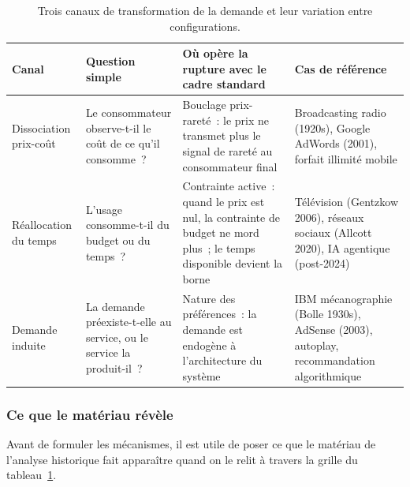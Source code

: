 \begin{table}[!ht]
\caption{Trois canaux de transformation de la demande et leur variation entre configurations.}\label{tab:d5-canaux}
\centering\footnotesize
\renewcommand{\arraystretch}{1.35}
\begin{tabularx}{\textwidth}{@{}p{2.2cm}Xp{3.2cm}p{3.2cm}@{}}
\toprule
\textbf{Canal} & \textbf{Question simple} & \textbf{Où opère la rupture avec le cadre standard} & \textbf{Cas de référence} \\
\midrule
Dissociation prix-coût & Le consommateur observe-t-il le coût de ce qu'il consomme~? & Bouclage prix-rareté~: le prix ne transmet plus le signal de rareté au consommateur final & Broadcasting radio (1920s), Google AdWords (2001), forfait illimité mobile \\[4pt]
Réallocation du temps & L'usage consomme-t-il du budget ou du temps~? & Contrainte active~: quand le prix est nul, la contrainte de budget ne mord plus~; le temps disponible devient la borne & Télévision (Gentzkow 2006), réseaux sociaux (Allcott 2020), IA agentique (post-2024) \\[4pt]
Demande induite & La demande préexiste-t-elle au service, ou le service la produit-il~? & Nature des préférences~: la demande est endogène à l'architecture du système & IBM mécanographie (Bolle 1930s), AdSense (2003), autoplay, recommandation algorithmique \\
\bottomrule
\end{tabularx}
\renewcommand{\arraystretch}{1.0}
\end{table}


\subsubsection{Ce que le matériau révèle}

Avant de formuler les mécanismes, il est utile de poser ce que le matériau de l'analyse historique fait apparaître quand on le relit à travers la grille du tableau~\ref{tab:d5-canaux}.

